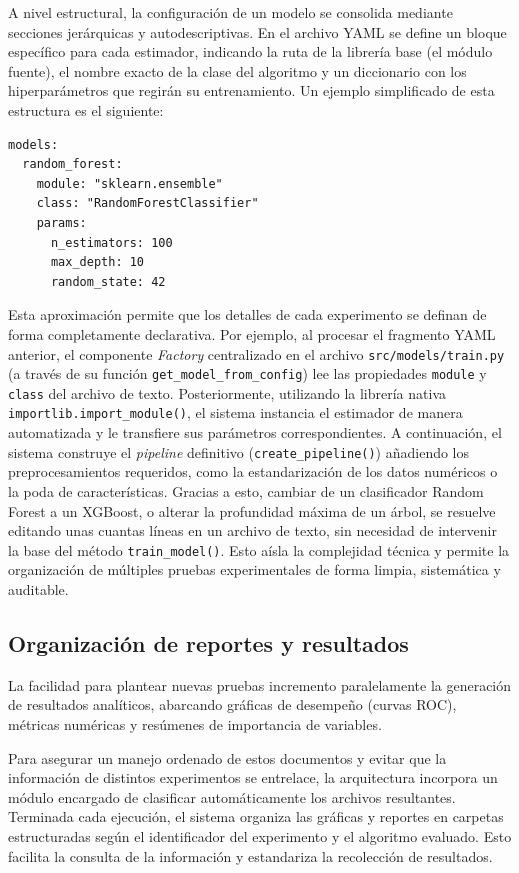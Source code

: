 A nivel estructural, la configuración de un modelo se consolida mediante secciones jerárquicas y autodescriptivas. En el archivo YAML se define un bloque específico para cada estimador, indicando la ruta de la librería base (el módulo fuente), el nombre exacto de la clase del algoritmo y un diccionario con los hiperparámetros que regirán su entrenamiento. Un ejemplo simplificado de esta estructura es el siguiente:

\begin{verbatim}
models:
  random_forest:
    module: "sklearn.ensemble"
    class: "RandomForestClassifier"
    params:
      n_estimators: 100
      max_depth: 10
      random_state: 42
\end{verbatim}

Esta aproximación permite que los detalles de cada experimento se definan de forma completamente declarativa. Por ejemplo, al procesar el fragmento YAML anterior, el componente \textit{Factory} centralizado en el archivo \texttt{src/models/train.py} (a través de su función \texttt{get\_model\_from\_config}) lee las propiedades \texttt{module} y \texttt{class} del archivo de texto. Posteriormente, utilizando la librería nativa \texttt{importlib.import\_module()}, el sistema instancia el estimador de manera automatizada y le transfiere sus parámetros correspondientes. A continuación, el sistema construye el \textit{pipeline} definitivo (\texttt{create\_pipeline()}) añadiendo los preprocesamientos requeridos, como la estandarización de los datos numéricos o la poda de características. Gracias a esto, cambiar de un clasificador Random Forest a un XGBoost, o alterar la profundidad máxima de un árbol, se resuelve editando unas cuantas líneas en un archivo de texto, sin necesidad de intervenir la base del método \texttt{train\_model()}. Esto aísla la complejidad técnica y permite la organización de múltiples pruebas experimentales de forma limpia, sistemática y auditable.

\subsection{Organización de reportes y resultados}

La facilidad para plantear nuevas pruebas incremento paralelamente la generación de resultados analíticos, abarcando gráficas de desempeño (curvas ROC), métricas numéricas y resúmenes de importancia de variables.

Para asegurar un manejo ordenado de estos documentos y evitar que la información de distintos experimentos se entrelace, la arquitectura incorpora un módulo encargado de clasificar automáticamente los archivos resultantes. Terminada cada ejecución, el sistema organiza las gráficas y reportes en carpetas estructuradas según el identificador del experimento y el algoritmo evaluado. Esto facilita la consulta de la información y estandariza la recolección de resultados.

